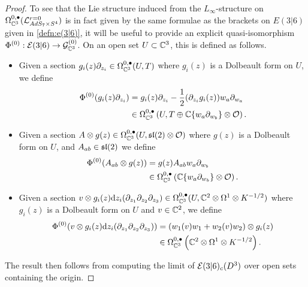\begin{proof}
To see that the Lie structure induced from the $L_\infty$-structure on $\Omega^{0,\bullet}_{\mathbb{C}^3} (\mathcal{L}^{r=0}_{AdS_7\times S^4} )$ is in fact given by the same formulae as the brackets on $E(3|6)$ given in \ref{defn:e(3|6)}, it will be useful to provide an explicit quasi-isomorphism $\Phi^{(0)} : \mathcal{E}(3|6) \to \mathcal{G}^{(0)}_{\mathbb{C}^3}$. On an open set $U\subset \mathbb{C}^3$, this is defined as follows.

\begin{itemize}
\item Given a section $g_i(z)\partial_{z_i}\in \Omega^{0,\bullet}_{\mathbb{C}^3} (U, T)$ where $g_i(z)$ is a Dolbeault form on $U$, we define
\begin{align*}
\Phi^{(0)} (g_i (z) \partial_{z_i} ) &= g_i (z) \partial_{z_i} - \frac 12(\partial_{z_i} g_i (z)) w_a \partial_{w_a} \\
&\in \Omega^{0,\bullet}_{\mathbb{C}^3} \left ( U, T \oplus \mathbb{C} \{w_a \partial_{w_b} \} \otimes \mathcal{O} \right ).  
\end{align*}

\item Given a section $A\otimes g(z)\in \Omega^{0,\bullet}_{\mathbb{C}^3} (U,\mathfrak{sl}(2) \otimes \mathcal{O})$ where $g(z)$ is a Dolbeault form on $U$, and $A_{ab}\in \mathfrak{sl}(2)$ we define
\begin{align*}
\Phi^{(0)} (A_{ab}\otimes g(z) ) &=  g(z) A_{ab}w_a\partial_{w_b}\\
&\in \Omega^{0,\bullet}_{\mathbb{C}^3} \left ( \mathbb{C} \{w_a \partial_{w_b} \} \otimes \mathcal{O} \right ).  
\end{align*}

\item Given a section $v\otimes g_i(z)\mathrm{d} z_i (\partial_{z_1}\partial_{z_2}\partial_{z_3} ) \in \Omega^{0,\bullet}_{\mathbb{C}^3} (U, \mathbb{C}^2\otimes \Omega^1\otimes K^{-1/2})$ where $g_i(z)$ is a Dolbeault form on $U$ and $v\in \mathbb{C}^2$, we define
\begin{align*}
\Phi^{(0)} (v\otimes g_i(z)\mathrm{d} z_i (\partial_{z_1}\partial_{z_2}\partial_{z_3} ) ) &= (w_1(v)w_1+w_2(v)w_2) \otimes g_i(z)  \\
&\in \Omega^{0,\bullet}_{\mathbb{C}^3} \left ( \mathbb{C}^2\otimes \Omega^1\otimes K^{-1/2}  \right ).  
\end{align*}
\end{itemize}

The result then follows from computing the limit of $\mathcal{E}(3|6)_c (D^3)$ over open sets containing the origin.
\end{proof}


